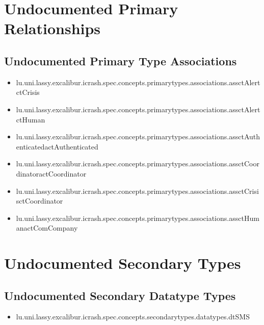\section[Undocumented Primary Type Relationships]{Undocumented Primary Relationships}

\subsection[Undocumented Primary Type Associations]{Undocumented Primary Type Associations}
\begin{itemize}
\item lu.uni.lassy.excalibur.icrash.spec.concepts.primarytypes.associations.assctAlertctCrisis 
\item lu.uni.lassy.excalibur.icrash.spec.concepts.primarytypes.associations.assctAlertctHuman 
\item lu.uni.lassy.excalibur.icrash.spec.concepts.primarytypes.associations.assctAuthenticatedactAuthenticated 
\item lu.uni.lassy.excalibur.icrash.spec.concepts.primarytypes.associations.assctCoordinatoractCoordinator 
\item lu.uni.lassy.excalibur.icrash.spec.concepts.primarytypes.associations.assctCrisisctCoordinator 
\item lu.uni.lassy.excalibur.icrash.spec.concepts.primarytypes.associations.assctHumanactComCompany 
\end{itemize}








\section[Undocumented Secondary Types]{Undocumented Secondary Types}


\subsection[Undocumented Secondary Datatype Types]{Undocumented Secondary Datatype Types}
\begin{itemize}
\item lu.uni.lassy.excalibur.icrash.spec.concepts.secondarytypes.datatypes.dtSMS 
\end{itemize}










